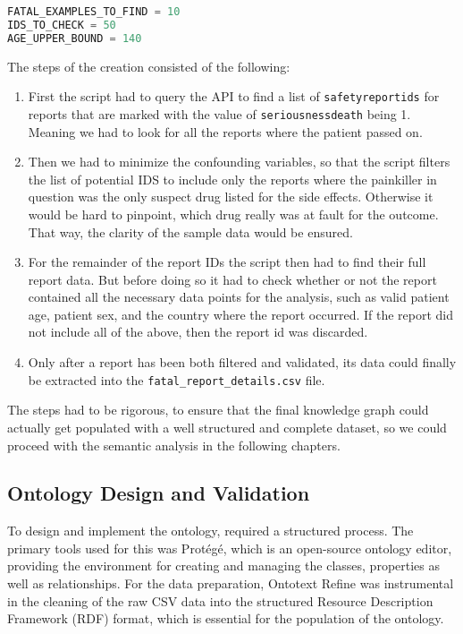 \begin{lstlisting}[language=Python, caption={Key parameters for fatal report sampling.}, label={lst:fatal_params}, captionpos=b]
FATAL_EXAMPLES_TO_FIND = 10
IDS_TO_CHECK = 50
AGE_UPPER_BOUND = 140
\end{lstlisting}

The steps of the creation consisted of the following:
\begin{enumerate}
    \item First the script had to query the API to find a list of \nolinkurl{safetyreportids} for reports that are marked with the value of \nolinkurl{seriousnessdeath} being 1. Meaning we had to look for all the reports where the patient passed on.
    \item Then we had to minimize the confounding variables, so that the script filters the list of potential IDS to include only the reports where the painkiller in question was the only suspect drug listed for the side effects. Otherwise it would be hard to pinpoint, which drug really was at fault for the outcome. That way, the clarity of the sample data would be ensured.
    \item For the remainder of the report IDs the script then had to find their full report data. But before doing so it had to check whether or not the report contained all the necessary data points for the analysis, such as valid patient age, patient sex, and the country where the report occurred. If the report did not include all of the above, then the report id was discarded.
    \item Only after a report has been both filtered and validated, its data could finally be extracted into the \nolinkurl{fatal_report_details.csv} file.
\end{enumerate}
The steps had to be rigorous, to ensure that the final knowledge graph could actually get populated with a well structured and complete dataset, so we could proceed with the semantic analysis in the following chapters. 
\subsection{Ontology Design and Validation}
To design and implement the ontology, required a structured process. The primary tools used for this was Protégé, which is an open-source ontology editor, providing the environment for creating and managing the classes, properties as well as relationships. For the data preparation, Ontotext Refine was instrumental in the cleaning of the raw CSV data into the structured Resource Description Framework (RDF) format, which is essential for the population of the ontology. 
